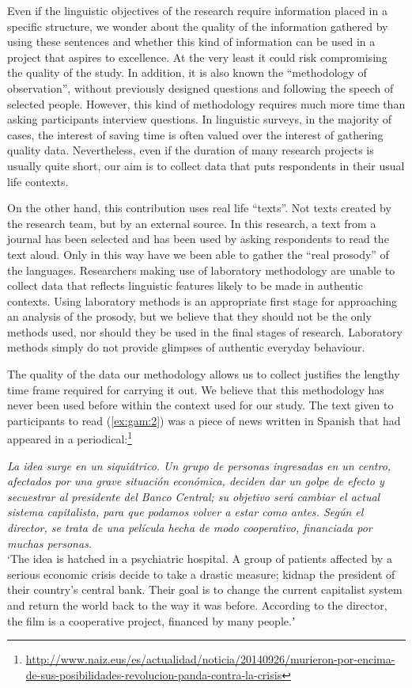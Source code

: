 \documentclass[output=paper]{langsci/langscibook}
\begin{document}
Even if the linguistic objectives of the research require information placed in a specific structure, we wonder about the quality of the information gathered by using these sentences and whether this kind of information can be used in a project that aspires to excellence. At the very least it could risk compromising the quality of the study. In addition, it is also known the ``methodology of observation”, without previously designed questions and following the speech of selected people. However, this kind of methodology requires much more time than asking participants interview questions. In linguistic surveys, in the majority of cases, the interest of saving time is often valued over the interest of gathering quality data. Nevertheless, even if the duration of many research projects is usually quite short, our aim is to collect data that puts respondents in their usual life contexts.

On the other hand, this contribution uses real life “texts”. Not texts created by the research team, but by an external source. In this research, a text from a journal has been selected and has been used by asking respondents to read the text aloud. Only in this way have we been able to gather the “real prosody” of the languages. Researchers making use of laboratory methodology are unable to collect data that reflects linguistic features likely to be made in authentic contexts. Using laboratory methods is an appropriate first stage for approaching an analysis of the prosody, but we believe that they should not be the only methods used, nor should they be used in the final stages of research. Laboratory methods simply do not provide glimpses of authentic everyday behaviour. 

The quality of the data our methodology allows us to collect justifies the lengthy time frame required for carrying it out. We believe that this methodology has never been used before within the context used for our study. The text given to participants to read (\ref{ex:gam:2}) was a piece of news written in Spanish that had appeared in a periodical:\footnote{\url{http://www.naiz.eus/es/actualidad/noticia/20140926/murieron-por-encima-de-sus-posibilidades-revolucion-panda-contra-la-crisis}}

\ea
  \label{ex:gam:2}
\justify \textit{La idea surge en un siquiátrico. Un grupo de personas ingresadas en un centro, afectados por una grave situación económica, deciden dar un golpe de efecto y secuestrar al presidente del Banco Central; su objetivo será cambiar el actual sistema capitalista, para que podamos volver a estar como antes. Según el director, se trata de una película hecha de modo cooperativo, financiada por muchas personas.} \\
\justify `The idea is hatched in a psychiatric hospital. A group of patients affected by a serious economic crisis decide to take a drastic measure; kidnap the president of their country's central bank. Their goal is to change the current capitalist system and return the world back to the way it was before. According to the director, the film is a cooperative project, financed by many people.ʼ \\
\end{document}
